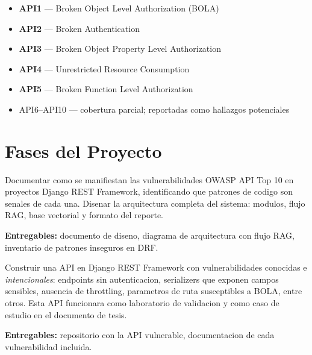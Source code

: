 \documentclass[12pt, a4paper]{article}
\begin{document}
\begin{itemize}[leftmargin=1.5em, itemsep=4pt]
  \item \textbf{API1} --- Broken Object Level Authorization (BOLA)
  \item \textbf{API2} --- Broken Authentication
  \item \textbf{API3} --- Broken Object Property Level Authorization
  \item \textbf{API4} --- Unrestricted Resource Consumption
  \item \textbf{API5} --- Broken Function Level Authorization
  \item \textcolor{graydark}{API6--API10 --- cobertura parcial; reportadas como hallazgos potenciales}
\end{itemize}

\newpage
\section{Fases del Proyecto}

\begin{infobox}[title={Fase 1 --- Marco teorico y diseno de la herramienta}]
Documentar como se manifiestan las vulnerabilidades OWASP API Top 10 en proyectos Django REST Framework, identificando que patrones de codigo son senales de cada una. Disenar la arquitectura completa del sistema: modulos, flujo RAG, base vectorial y formato del reporte.

\smallskip
\textbf{Entregables:} documento de diseno, diagrama de arquitectura con flujo RAG, inventario de patrones inseguros en DRF.
\end{infobox}

\begin{successbox}[title={Fase 2 --- API Django vulnerable de prueba}]
Construir una API en Django REST Framework con vulnerabilidades conocidas e \textit{intencionales}: endpoints sin autenticacion, serializers que exponen campos sensibles, ausencia de throttling, parametros de ruta susceptibles a BOLA, entre otros. Esta API funcionara como laboratorio de validacion y como caso de estudio en el documento de tesis.

\smallskip
\textbf{Entregables:} repositorio con la API vulnerable, documentacion de cada vulnerabilidad incluida.
\end{successbox}
\end{document}
